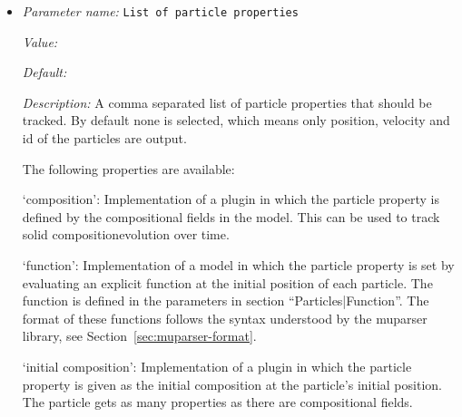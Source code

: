 \begin{itemize}
{\it Default:} cell average


{\it Description:} Select one of the following models:

`bilinear least squares': Interpolates particle properties onto a vector of points using a bilinear least squares method. Currently only 2D models are supported. Note that deal.II must be configured with BLAS/LAPACK.

`cell average': Return the average of all particle properties in the given cell.

`harmonic average': Return the harmonic average of all particle properties in the given cell. If the cell contains no particles, return the harmonic average of the properties in the neighboring cells.

`nearest neighbor': Return the properties of the nearest neighboring particle in the current cell, or nearest particle in nearest neighboring cell if current cell is empty.


{\it Possible values:} Any one of bilinear least squares, cell average, harmonic average, nearest neighbor
\item {\it Parameter name:} {\tt List of particle properties}
\label{parameters:Postprocess/Particles/List of particle properties}


{\it Value:} 


{\it Default:} 


{\it Description:} A comma separated list of particle properties that should be tracked. By default none is selected, which means only position, velocity and id of the particles are output. 

The following properties are available:

`composition': Implementation of a plugin in which the particle property is defined by the compositional fields in the model. This can be used to track solid compositionevolution over time.

`function': Implementation of a model in which the particle property is set by evaluating an explicit function at the initial position of each particle. The function is defined in the parameters in section ``Particles|Function''. The format of these functions follows the syntax understood by the muparser library, see Section~\ref{sec:muparser-format}.

`initial composition': Implementation of a plugin in which the particle property is given as the initial composition at the particle's initial position. The particle gets as many properties as there are compositional fields.


\end{itemize}
